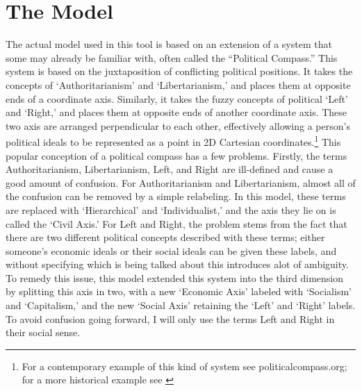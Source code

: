 \documentclass[12pt]{article}
\begin{document}
\section{The Model} \label{TheModel}
\qquad The actual model used in this tool is based on an extension of a system that some may already be familiar with, often called the ``Political Compass.'' This system is based on the juxtaposition of conflicting political positions. It takes the concepts of `Authoritarianism' and `Libertarianism,' and places them at opposite ends of a coordinate axis. Similarly, it takes the fuzzy concepts of political `Left' and `Right,' and places them at opposite ends of another coordinate axis. These two axis are arranged perpendicular to each other, effectively allowing a person's political ideals to be represented as a point in 2D Cartesian coordinates.\footnote{For a contemporary example of this kind of system see politicalcompass.org; for a more historical example see \cite{brysonmcdill}} This popular conception of a political compass has a few problems. Firstly, the terms Authoritarianism, Libertarianism, Left, and Right are ill-defined and cause a good amount of confusion. For Authoritarianism and Libertarianism, almost all of the confusion can be removed by a simple relabeling. In this model, these terms are replaced with `Hierarchical' and `Individualist,' and the axis they lie on is called the `Civil Axis.' For Left and Right, the problem stems from the fact that there are two different political concepts described with these terms; either someone's economic ideals or their social ideals can be given these labels, and without specifying which is being talked about this introduces alot of ambiguity. To remedy this issue, this model extended this system into the third dimension by splitting this axis in two, with a new `Economic Axis' labeled with `Socialism' and `Capitalism,' and the new `Social Axis' retaining the `Left' and `Right' labels. To avoid confusion going forward, I will only use the terms Left and Right in their social sense. \\
\end{document}
